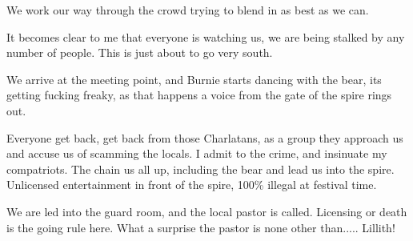 We work our way through the crowd trying to blend in as best as we can.\medskip

It becomes clear to me that everyone is watching us, we are being stalked by any number of people. This is just about to go very south.\medskip

We arrive at the meeting point, and Burnie starts dancing with the bear, its getting fucking freaky, as that happens a voice from the gate of the spire rings out.\medskip

Everyone get back, get back from those Charlatans, as a group they approach us and accuse us of scamming the locals. I admit to the crime, and insinuate my compatriots. The chain us all up, including the bear and lead us into the spire. Unlicensed entertainment in front of the spire, 100\% illegal at festival time.\medskip

We are led into the guard room, and the local pastor is called. Licensing or death is the going rule here. What a surprise the pastor is none other than..... Lillith!\medskip

\vspace*{5mm}

